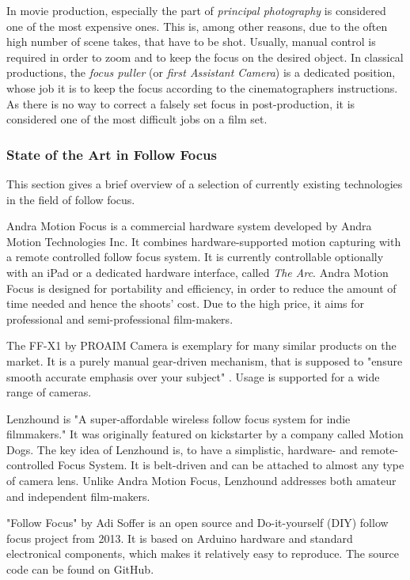 \documentclass{sigchi}
\begin{document}
In movie production, especially the part of \textit{principal photography} is considered one of the most expensive ones. This is, among other reasons, due to the often high number of scene takes, that have to be shot. \cite{kcrabb}
Usually, manual control is required in order to zoom and to keep the focus on the desired object. In classical productions, the \textit{focus puller} (or \textit{first Assistant Camera}) is a dedicated position, whose job it is to keep the focus according to the cinematographers instructions. As there is no way to correct a falsely set focus in post-production, it is considered one of the most difficult jobs on a film set. \cite{cineman}

\subsubsection{State of the Art in Follow Focus}

This section gives a brief overview of a selection of currently existing technologies in the field of follow focus. 

Andra Motion Focus is a commercial hardware system developed by Andra Motion Technologies Inc. It combines hardware-supported motion capturing with a remote controlled follow focus system. It is currently controllable optionally with an iPad or a dedicated hardware interface, called \textit{The Arc}. Andra Motion Focus is designed for portability and efficiency, in order to reduce the amount of time needed and hence the shoots' cost. Due to the high price, it aims for professional and semi-professional film-makers. \cite{andra}

The FF-X1 by PROAIM Camera is exemplary for many similar products on the market. It is a purely manual gear-driven mechanism, that is supposed to "ensure smooth accurate emphasis over your subject" \cite{proaim}. Usage is supported for a wide range of cameras. 

Lenzhound is "A super-affordable wireless follow focus system for indie filmmakers." \cite{kicklenz} It was originally featured on kickstarter by a company called Motion Dogs. The key idea of Lenzhound is, to have a simplistic, hardware- and remote-controlled Focus System. It is belt-driven and can be attached to almost any type of camera lens. Unlike Andra Motion Focus, Lenzhound addresses both amateur and independent film-makers. 

"Follow Focus" by Adi Soffer is an open source and Do-it-yourself (DIY) follow focus project from 2013. It is based on Arduino hardware and standard electronical components, which makes it relatively easy to reproduce. The source code can be found on GitHub. \cite{soffer}
\end{document}
